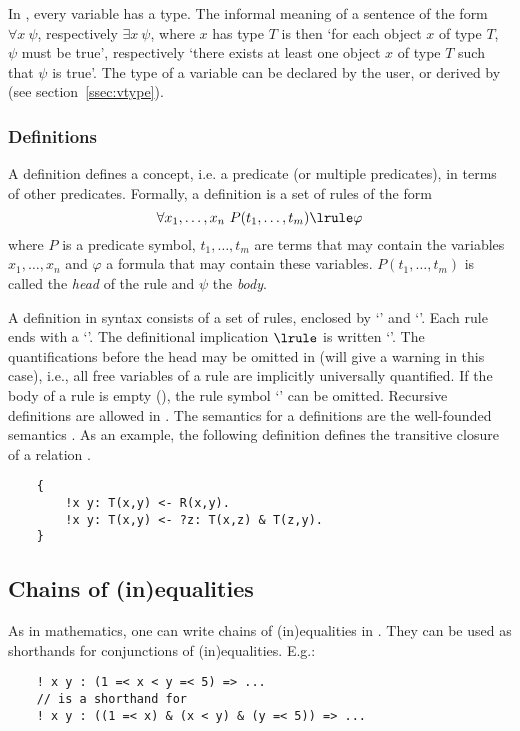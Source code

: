In \idp, every variable has a type. The informal meaning of a sentence of the form $\forall x\ \psi$, respectively $\exists x\ \psi$, where $x$ has type $T$ is then `for each object $x$ of type $T$, $\psi$ must be true', respectively `there exists at least one object $x$ of type $T$ such that $\psi$ is true'. The type of a variable can be declared by the user, or derived by \idp (see section~\ref{ssec:vtype}).


\subsubsection{Definitions}
A definition defines a concept, i.e. a predicate (or multiple predicates), in terms of other predicates. Formally, a definition is a set of rules of the form 
\[ \forall x_1,\ldots,x_n\ P(t_1,\ldots,t_m) \lrule \varphi \]
where $P$ is a predicate symbol, $t_1,\ldots,t_m$ are terms that may contain the variables $x_1,\ldots,x_n$ and $\varphi$ a formula that may contain these variables. $P(t_1,\ldots,t_m)$ is called the \emph{head} of the rule and $\psi$ the \emph{body}. 

A definition in \idp syntax consists of a set of rules, enclosed by `\code{\{}' and `\code{\}}'. Each rule ends with a `'. The definitional implication $\lrule$ is written `\code{<-}'. The quantifications before the head may be omitted in \idp (\idp will give a warning in this case), i.e., all free variables of a rule are implicitly universally quantified. If the body of a rule is empty (), the rule symbol `\code{<-}' can be omitted. Recursive definitions are allowed in \idp. The semantics for a definitions are the well-founded semantics .
As an example, the following definition defines the transitive closure of a relation .
\begin{lstlisting}
	{
		!x y: T(x,y) <- R(x,y).
		!x y: T(x,y) <- ?z: T(x,z) & T(z,y).
	}
\end{lstlisting}



\subsection{Chains of (in)equalities}
As in mathematics, one can write chains of (in)equalities in \idp. They can be used as shorthands for conjunctions of (in)equalities. E.g.:
\begin{lstlisting}
	! x y : (1 =< x < y =< 5) => ...
	// is a shorthand for
	! x y : ((1 =< x) & (x < y) & (y =< 5)) => ...
\end{lstlisting}

